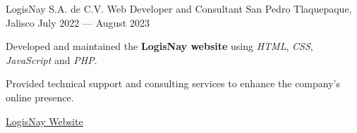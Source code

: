 \begin{cventries}
  \cventry
  {LogisNay S.A. de C.V.}
  {Web Developer and Consultant}
  {San Pedro Tlaquepaque, Jalisco}
  {July 2022 --- August 2023}
  {
    \begin{cvitems}
      \item {Developed and maintained the \textbf{LogisNay website} using \textit{HTML}, \textit{CSS}, \textit{JavaScript} and \textit{PHP}.}
      \item {Provided technical support and consulting services to enhance the company's online presence.}
    \end{cvitems}
    \vspace{2.5em}
    \begin{cvitemsNoBullet}
      \item{
                  \underline{\href{https://logisnay.com}{LogisNay Website \faExternalLink}}
            }
    \end{cvitemsNoBullet}
  }

\end{cventries}